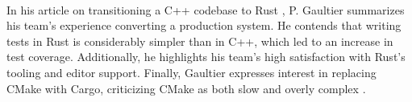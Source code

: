 \paragraph{}

In his article on transitioning a C++ codebase to Rust \cite[]{gaultierHowRewriteCodebase}, P. Gaultier summarizes his team's experience converting a production system. He contends that writing tests in Rust is considerably simpler than in C++, which led to an increase in test coverage. Additionally, he highlights his team's high satisfaction with Rust's tooling and editor support. Finally, Gaultier expresses interest in replacing CMake with Cargo, criticizing CMake as both slow and overly complex \cite[]{gaultierHowRewriteCodebase}.